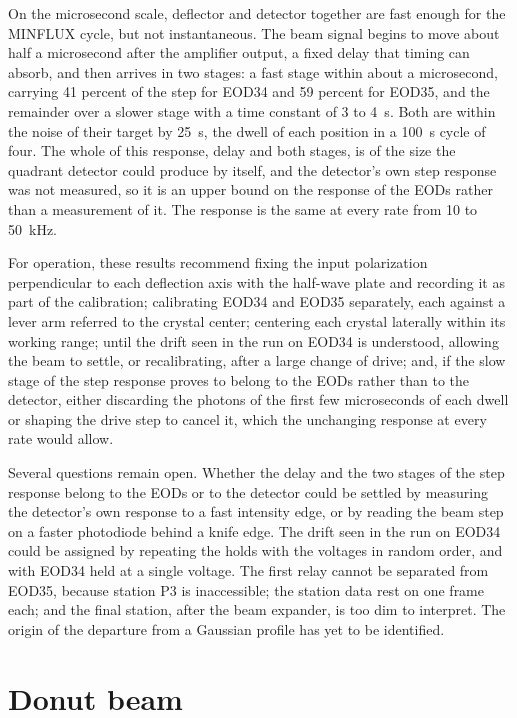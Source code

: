 \documentclass{article}
\begin{document}
On the microsecond scale, deflector and detector together are fast enough for the MINFLUX cycle,
but not instantaneous. The beam signal begins to move about half a microsecond after the amplifier
output, a fixed delay that timing can absorb, and then arrives in two stages: a fast stage within
about a microsecond, carrying 41 percent of the step for EOD34 and 59 percent for EOD35, and the
remainder over a slower stage with a time constant of 3 to 4~\textmu s. Both are within the noise
of their target by 25~\textmu s, the dwell of each position in a 100~\textmu s cycle of four. The
whole of this response, delay and both stages, is of the size the quadrant detector could produce
by itself, and the detector's own step response was not measured, so it is an upper bound on the
response of the EODs rather than a measurement of it. The response is the same at every rate from
10 to 50~kHz.

For operation, these results recommend fixing the input polarization perpendicular to each
deflection axis with the half-wave plate and recording it as part of the calibration; calibrating
EOD34 and EOD35 separately, each against a lever arm referred to the crystal center; centering each
crystal laterally within its working range; until the drift seen in the run on EOD34 is
understood, allowing the beam to settle, or recalibrating, after a large change of drive; and, if
the slow stage of the step response proves to belong to the EODs rather than to the detector,
either discarding the photons of the first few microseconds of each dwell or shaping the drive step
to cancel it, which the unchanging response at every rate would allow.

Several questions remain open. Whether the delay and the two stages of the step response belong
to the EODs or to the detector could be settled by measuring the detector's own response to a
fast intensity edge, or by reading the beam step on a faster photodiode behind a knife edge. The
drift seen in the run on EOD34 could be assigned by repeating the holds with the voltages in random
order, and with EOD34 held at a single voltage. The first relay cannot be
separated from EOD35, because station P3 is inaccessible; the station data rest on one frame
each; and the final station, after the beam expander, is too dim to interpret. The origin
of the departure from a Gaussian profile has yet to be identified.
\section{Donut beam}
\label{sec:donut}
\end{document}
